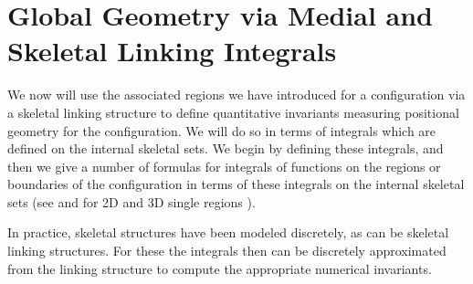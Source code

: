 \documentclass[10pt]{amsart}
\theoremstyle{definition}
\theoremstyle{definition}
\numberwithin{equation}{section}
\begin{document}
\section{Global Geometry via Medial and Skeletal Linking Integrals} 
\label{SII:SkelLnkInt}
\par
We now will use the associated regions we have introduced for a 
configuration via a skeletal linking structure to define quantitative 
invariants measuring positional geometry for the configuration.  We will 
do so in terms of integrals which are defined on the internal skeletal sets.  
We begin by defining these integrals, and then we give a number of 
formulas for integrals of functions on the regions or boundaries of the 
configuration in terms of these integrals on the internal skeletal sets 
(see \cite[\S 10]{DG} and for 2D and 3D single regions \cite[\S 3.4]{D5}). 
\par 
In practice, skeletal structures have been modeled discretely, as can be 
skeletal linking structures.  For these the integrals then can be discretely 
approximated from the linking structure to compute the appropriate 
numerical invariants. \par
\end{document}
